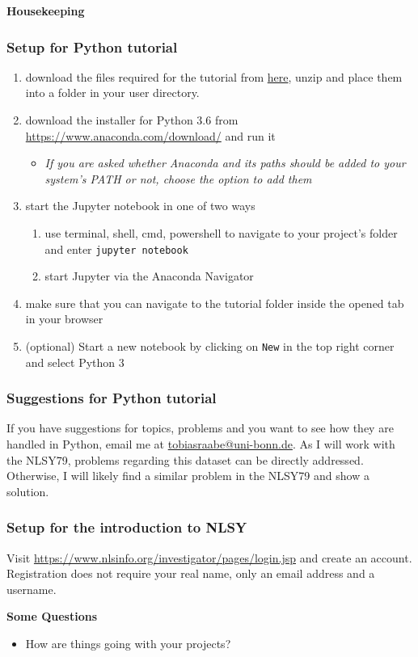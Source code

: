 \begin{frame}\begin{center}
\LARGE\textbf{Housekeeping}
\end{center}\end{frame}

\begin{frame}[c]\frametitle{Setup for Python tutorial}
\begin{enumerate}
    \item download the files required for the tutorial from \href{https://www.dropbox.com/sh/0onu61t2olg2gwz/AAAtqiANuKODdBDdPlGTYtXja?dl=0}{here}, unzip and place them into a folder in your user directory.
    \item download the installer for Python 3.6 from \url{https://www.anaconda.com/download/} and run it
    \begin{itemize}
        \item \textit{If you are asked whether Anaconda and its paths should be added to your system's PATH or not, choose the option to add them}
    \end{itemize}
    \item start the Jupyter notebook in one of two ways
    \begin{enumerate}
        \item use terminal, shell, cmd, powershell to navigate to your project's folder and enter \texttt{jupyter notebook}
        \item start Jupyter via the Anaconda Navigator
    \end{enumerate}
    \item make sure that you can navigate to the tutorial folder inside the opened tab in your browser
    \item (optional) Start a new notebook by clicking on \texttt{New} in the top right corner and select Python 3
\end{enumerate}
\end{frame}

\begin{frame}[c]\frametitle{Suggestions for Python tutorial}
If you have suggestions for topics, problems and you want to see how they are handled in Python, email me at \href{mailto:tobiasraabe@uni-bonn.de}{tobiasraabe@uni-bonn.de}. As I will work with the NLSY79, problems regarding this dataset can be directly addressed. Otherwise, I will likely find a similar problem in the NLSY79 and show a solution.
\end{frame}

\begin{frame}[c]\frametitle{Setup for the introduction to NLSY}
Visit \url{https://www.nlsinfo.org/investigator/pages/login.jsp} and create an account. Registration does not require your real name, only an email address and a username.
\end{frame}


\begin{frame}\textbf{Some Questions}\vspace{0.3cm}
\begin{itemize}\setlength\itemsep{1em}
\item How are things going with your projects?
\end{itemize}
\end{frame}
